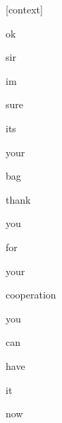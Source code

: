 \documentclass[varwidth]{standalone}
\begin{document}
\begin{CJK*}{UTF8}{gbsn}
{\setlength{\fboxsep}{0pt}\colorbox{white!0}{\parbox{0.9\textwidth}{
\colorbox{red!2.680412807324235e-18}{\strut [context]} \colorbox{red!6.917094674818713e-10}{\strut ok} \colorbox{red!7.859155175538035e-07}{\strut sir} \colorbox{red!5.359716396924341e-06}{\strut im} \colorbox{red!1.4685335372632835e-05}{\strut sure} \colorbox{red!0.030169030651450157}{\strut its} \colorbox{red!0.12439890205860138}{\strut your} \colorbox{red!0.0013998005306348205}{\strut bag} \colorbox{red!69.8024673461914}{\strut thank} \colorbox{red!7.791748523712158}{\strut you} \colorbox{red!5.478270530700684}{\strut for} \colorbox{red!16.742752075195312}{\strut your} \colorbox{red!0.0007563884719274938}{\strut cooperation} \colorbox{red!0.001976126106455922}{\strut you} \colorbox{red!0.006196505390107632}{\strut can} \colorbox{red!7.408405508613214e-05}{\strut have} \colorbox{red!0.00204765098169446}{\strut it} \colorbox{red!0.017725447192788124}{\strut now} 
}}}
\end{CJK*}
\end{document}
